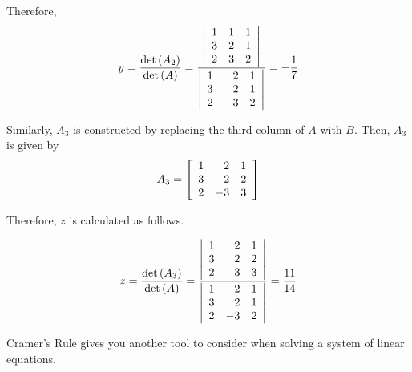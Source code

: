 \begin{solution}
Therefore, 
\begin{equation*}
y=\vspace{0.05in}\frac{\det \left(A_{2}\right)}{\det \left(A\right)} = \vspace{0.05in}\frac{\left|
\begin{array}{rrr}
1 & 1 & 1 \\
3 & 2 & 1 \\
2 & 3 & 2
\end{array}
\right| }{\left|
\begin{array}{rrr}
1 & 2 & 1 \\
3 & 2 & 1 \\
2 & -3 & 2
\end{array}
\right| }=-\vspace{0.05in}\frac{1}{7}
\end{equation*}

Similarly, $A_3$ is constructed by replacing the third column of $A$ with $B$. Then, $A_3$ is given by
\begin{equation*}
A_3
=
\left[
\begin{array}{rrr}
1 & 2 & 1 \\
3 & 2 & 2 \\
2 & -3 & 3
\end{array}
\right]
\end{equation*}

Therefore, $z$ is calculated as follows. 

\begin{equation*}
z=
\vspace{0.05in}\frac{\det \left(A_{3}\right)}{\det \left(A\right)}
=
\frac{\left|
\begin{array}{rrr}
1 & 2 & 1 \\
3 & 2 & 2 \\
2 & -3 & 3
\end{array}
\right| }{\left|
\begin{array}{rrr}
1 & 2 & 1 \\
3 & 2 & 1 \\
2 & -3 & 2
\end{array}
\right| }=\frac{11}{14}
\end{equation*}
\end{solution}

Cramer's Rule gives you another tool to consider when solving a system of linear equations.

